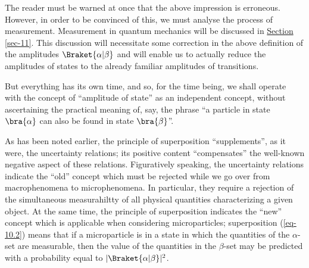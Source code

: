 \documentclass[a4paper,sfsidenotes,colorlinks=true]{tufte-book}
\numberwithin{equation}{section}
\numberwithin{figure}{section}
\begin{document}
The reader must be warned at once that the above impression is
erroneous. However, in order to be convinced of this, we must analyse
the process of measurement. Measurement in quantum mechanics will be
discussed in \hyperref[sec-11]{Section \ref{sec-11}}. This discussion
will necessitate some correction in the above definition of the
amplitudes $\Braket{\alpha | \beta}$ and will enable us to actually
reduce the amplitudes of states to the already familiar amplitudes of
transitions.

But everything has its own time, and so, for the time being, we shall
operate with the concept of ``amplitude of state'' as an independent
concept, without ascertaining the practical meaning of, say, the
phrase ``a particle in state $\bra{\alpha}$ can also be found in state $\bra{\beta}$''.

As has been noted earlier, the principle of superposition
``supplements'', as it were, the uncertainty relations; its positive
content ``compensates'' the well-known negative aspect of these
relations. Figuratively speaking, the uncertainty relations indicate
the ``old'' concept which must be rejected while we go over from
macrophenomena to microphenomena. In particular, they require a
rejection of the simultaneous measurahiltty of all physical quantities
characterizing a given object. At the same time, the principle of
superposition indicates the ``new'' concept which is applicable when
considering microparticles; superposition (\ref{eq-10.2}) means that if a
microparticle is in a state in which the quantities of the $\alpha$-set are
measurable, then the value of the quantities in the $\beta$-set may be predicted with a probability equal to $|\Braket{\alpha|\beta}|^{2}$.
\end{document}
